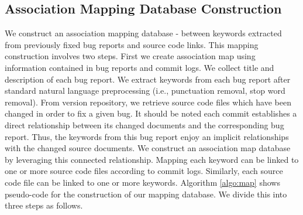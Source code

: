 \documentclass[conference]{IEEEtran}
\begin{document}
\subsection{Association Mapping Database Construction}\label{sec:MapConstruction}
We construct an association mapping database - between keywords extracted from previously fixed bug reports and source code links. 
This mapping construction involves two steps.
First we create association map using information contained in bug reports and commit logs. We collect title and description of each bug report. We extract keywords from each bug report after standard natural language preprocessing (i.e., punctuation removal, stop word removal). 
From version repository, 
we retrieve source code files which have been changed in order to fix a given bug. %
It should be noted each commit establishes a direct relationship between its changed documents and the corresponding bug report. 
Thus, the keywords from this bug report enjoy an implicit relationships with the changed source documents. 
We construct an association map database by leveraging this connected relationship. Mapping each keyword can be linked to one or more source code files according to commit logs. Similarly, each source code file can be linked to one or more keywords. 
Algorithm \ref{algo:map} shows pseudo-code for the construction of our mapping database. 
We divide this into three steps as follows.  

\end{document}
